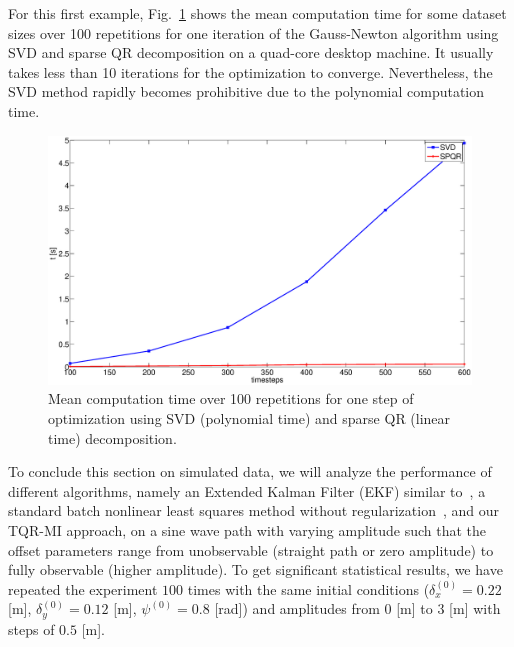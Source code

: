 For this first example, Fig.~\ref{fig:straight-path-time} shows the mean
computation time for some dataset sizes over 100 repetitions for one iteration
of the Gauss-Newton algorithm using SVD and sparse QR decomposition on a
quad-core desktop machine. It usually takes less than 10 iterations for the
optimization to converge. Nevertheless, the SVD method rapidly becomes
prohibitive due to the polynomial computation time.

\begin{figure}[t]
\centering
\includegraphics[width=\columnwidth]{fig/straight-path-time.eps}
\caption{Mean computation time over 100 repetitions for one step of
  optimization using SVD (polynomial time) and sparse QR (linear time)
  decomposition.}
\label{fig:straight-path-time}
\end{figure}

To conclude this section on simulated data, we will analyze the performance of
different algorithms, namely an Extended Kalman Filter (EKF) similar
to~\cite{martinelli06automatic}, a standard batch nonlinear least squares
method without regularization~\cite{kuemmerle11simultaneous}, and our TQR-MI
approach, on a sine wave path with varying amplitude such that the offset
parameters range from unobservable (straight path or zero amplitude) to
fully observable (higher amplitude). To get significant statistical results, we
have repeated the experiment $100$ times with the same initial conditions
($\delta_x^{(0)}=0.22$ [m], $\delta_y^{(0)}=0.12$ [m], $\psi^{(0)}=0.8$ [rad])
and amplitudes from $0$ [m] to $3$ [m] with steps of $0.5$ [m].


